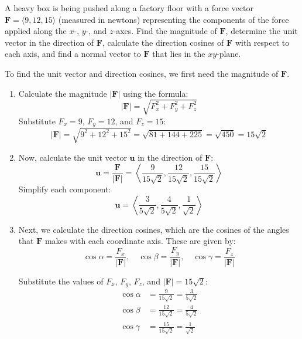 \exampleline
\begin{example}
A heavy box is being pushed along a factory floor with a force vector \( \mathbf{F} = \langle 9, 12, 15 \rangle \) (measured in newtons) representing the components of the force applied along the \( x \)-, \( y \)-, and \( z \)-axes. Find the magnitude of \( \mathbf{F} \), determine the unit vector in the direction of \( \mathbf{F} \), calculate the direction cosines of \( \mathbf{F} \) with respect to each axis, and find a normal vector to \( \mathbf{F} \) that lies in the $xy$-plane.

\begin{solution}
To find the unit vector and direction cosines, we first need the magnitude of \( \mathbf{F} \).

\begin{enumerate}
    \item Calculate the magnitude \( |\mathbf{F}| \) using the formula:
    \[
    |\mathbf{F}| = \sqrt{F_x^2 + F_y^2 + F_z^2}
    \]
    Substitute \( F_x = 9 \), \( F_y = 12 \), and \( F_z = 15 \):
    \[
    |\mathbf{F}| = \sqrt{9^2 + 12^2 + 15^2} = \sqrt{81 + 144 + 225} = \sqrt{450} = 15\sqrt{2}
    \]

    \item Now, calculate the unit vector \( \mathbf{u} \) in the direction of \( \mathbf{F} \):
    \[
    \mathbf{u} = \frac{\mathbf{F}}{|\mathbf{F}|} = \left\langle \frac{9}{15\sqrt{2}}, \frac{12}{15\sqrt{2}}, \frac{15}{15\sqrt{2}} \right\rangle
    \]
    Simplify each component:
    \[
    \mathbf{u} = \left\langle \frac{3}{5\sqrt{2}}, \frac{4}{5\sqrt{2}}, \frac{1}{\sqrt{2}} \right\rangle
    \]

    \item Next, we calculate the direction cosines, which are the cosines of the angles that \( \mathbf{F} \) makes with each coordinate axis. These are given by:
    \[
    \cos \alpha = \frac{F_x}{|\mathbf{F}|}, \quad \cos \beta = \frac{F_y}{|\mathbf{F}|}, \quad \cos \gamma = \frac{F_z}{|\mathbf{F}|}
    \]
    
    Substitute the values of \( F_x \), \( F_y \), \( F_z \), and \( |\mathbf{F}| = 15\sqrt{2} \):
    \begin{align*}
        \cos \alpha &= \frac{9}{15\sqrt{2}} = \frac{3}{5\sqrt{2}} \\
        \cos \beta &= \frac{12}{15\sqrt{2}} = \frac{4}{5\sqrt{2}} \\
        \cos \gamma &= \frac{15}{15\sqrt{2}} = \frac{1}{\sqrt{2}}
    \end{align*}


\end{enumerate}
\end{solution}
\end{example}
